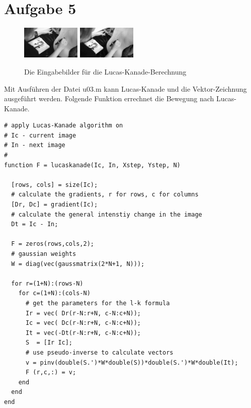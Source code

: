 




\newcommand{\nr}{3}


\section*{Aufgabe 5}

\begin{figure}[htpb]
\begin{center}
{\includegraphics[width=0.25\textwidth]{samples/mrs.easy/101.png}}
{\includegraphics[width=0.25\textwidth]{samples/mrs.easy/102.png}}
\end{center}
\caption{Die Eingabebilder für die Lucas-Kanade-Berechnung }
\label{fig:u03-picture}
\end{figure}

Mit Ausführen der Datei u03.m kann Lucas-Kanade und die Vektor-Zeichnung ausgeführt werden.
Folgende Funktion errechnet die Bewegung nach Lucas-Kanade.

\lstset{language=matlab}
\begin{lstlisting}[caption={Berechnung Lucas-Kanade}]
# apply Lucas-Kanade algorithm on
# Ic - current image
# In - next image
# 
function F = lucaskanade(Ic, In, Xstep, Ystep, N)

  [rows, cols] = size(Ic);
  # calculate the gradients, r for rows, c for columns
  [Dr, Dc] = gradient(Ic);
  # calculate the general intenstiy change in the image
  Dt = Ic - In;

  F = zeros(rows,cols,2);
  # gaussian weights
  W = diag(vec(gaussmatrix(2*N+1, N)));

  for r=(1+N):(rows-N)
    for c=(1+N):(cols-N)
      # get the parameters for the l-k formula
      Ir = vec( Dr(r-N:r+N, c-N:c+N));
      Ic = vec( Dc(r-N:r+N, c-N:c+N));
      It = vec(-Dt(r-N:r+N, c-N:c+N));
      S  = [Ir Ic];
      # use pseudo-inverse to calculate vectors
      v = pinv(double(S.')*W*double(S))*double(S.')*W*double(It);
      F (r,c,:) = v;
    end
  end
end
\end{lstlisting}

